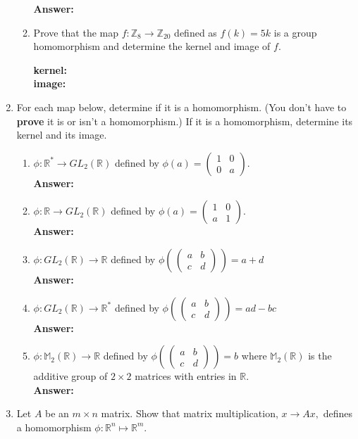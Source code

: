 \documentclass[12pt]{article}
\renewcommand{\emph}[1]{\textsf{\textbf{#1}}}
\newcommand{\bbZ}{\mathbb{Z}}
\newcommand{\bbR}{\mathbb{R}}
\begin{document}
\begin{enumerate}
\begin{enumerate}
	\textbf{Answer:} \\
	
	\item Prove that the map $f:\bbZ_8 \to \bbZ_{20}$ defined as $f(k)=5k$ is a group homomorphism and determine the kernel and image of $f.$
	
\textbf{kernel:} \\

\textbf{image:}\\
\end{enumerate}
\newpage
\item For each map below, determine if it is a homomorphism. (You don't have to \emph{prove} it is or isn't a homomorphism.) If it is a homomorphism, determine its kernel and its image.
	\begin{enumerate}
	\item $\phi: \bbR^* \to GL_2(\bbR)$ defined by $\phi(a)= \begin{pmatrix} 1&0\\0&a \end{pmatrix}.$\\
	\textbf{Answer:}
	\vfill
	\item $\phi: \bbR \to GL_2(\bbR)$ defined by $\phi(a)= \begin{pmatrix} 1&0\\a&1 \end{pmatrix}.$\\
	\textbf{Answer:}
	\vfill
	\item $\phi: GL_2(\bbR) \to  \bbR $ defined by $\phi\left( \, \begin{pmatrix} a&b\\c&d \end{pmatrix} \,\right) =a+d$\\
	\textbf{Answer:}
	\vfill
	\item $\phi: GL_2(\bbR) \to  \bbR^* $ defined by $\phi\left( \, \begin{pmatrix} a&b\\c&d \end{pmatrix} \,\right) =ad-bc$\\
	\textbf{Answer:}
	\vfill
	\item $\phi: \mathbb{M}_2(\bbR) \to  \bbR$ defined by $\phi\left( \, \begin{pmatrix} a&b\\c&d \end{pmatrix} \,\right) =b$ where $\mathbb{M}_2(\bbR)$ is the additive group of $2 \times 2$ matrices with entries in $\bbR.$\\
	\textbf{Answer:}
	\vfill
	\end{enumerate}
\newpage
\item Let $A$ be an $m \times n$ matrix. Show that matrix multiplication, $x \to Ax,$ defines a homomorphism $\phi: \bbR^n \mapsto \bbR^m.$\\


\end{enumerate}
\end{document}
